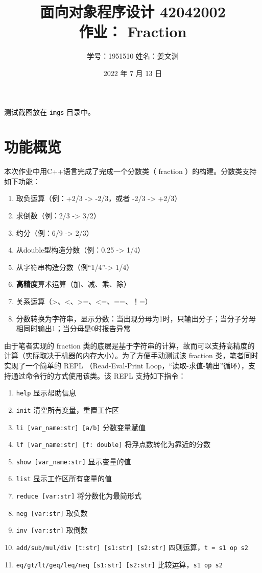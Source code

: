 \documentclass[cn,black,12pt,normal]{elegantnote}
\title{面向对象程序设计 42042002 \\ 作业： Fraction }
\author{学号：1951510 \hspace{30pt} 姓名：姜文渊}
\institute{Tongji University}
\date{2022 年 7 月 13 日}
\newcommand{\setParDef}{\setlength {\parskip} {0pt} }
\begin{document}
\maketitle

测试截图放在 \lstinline{imgs} 目录中。

\section{功能概览}

本次作业中用C++语言完成了完成一个分数类（ fraction ）的构建。分数类支持如下功能：
\begin{enumerate}
    \item 取负运算（例：+2/3 -> -2/3，或者 -2/3 -> +2/3）
    \item 求倒数（例：2/3 -> 3/2）
    \item 约分（例：6/9 -> 2/3）
    \item 从double型构造分数（例：0.25 -> 1/4）
    \item 从字符串构造分数（例“1/4”-> 1/4）
    \item \textbf{高精度}算术运算（加、减、乘、除）
    \item 关系运算（>、<、>=、<=、==、！=）
    \item 分数转换为字符串，显示分数：当出现分母为1时，只输出分子；当分子分母相同时输出1；当分母是0时报告异常
\end{enumerate}
由于笔者实现的 fraction 类的底层是基于字符串的计算，故而可以支持高精度的计算（实际取决于机器的内存大小）。为了方便手动测试该 fraction 类，笔者同时实现了一个简单的 REPL （Read-Eval-Print Loop，“读取-求值-输出”循环），支持通过命令行的方式使用该类。该 REPL 支持如下指令：
\begin{enumerate}
    \item \lstinline{help} 显示帮助信息
    \item \lstinline{init} 清空所有变量，重置工作区
    \item \lstinline{li [var_name:str] [a/b]} 分数变量赋值
    \item \lstinline{lf [var_name:str] [f: double]} 将浮点数转化为靠近的分数
    \item \lstinline{show [var_name:str]} 显示变量的值
    \item \lstinline{list} 显示工作区所有变量的值
    \item \lstinline{reduce [var:str]} 将分数化为最简形式
    \item \lstinline{neg [var:str]} 取负数
    \item \lstinline{inv [var:str]} 取倒数
    \item \lstinline{add/sub/mul/div [t:str] [s1:str] [s2:str]} 四则运算，\lstinline{t = s1 op s2}
    \item \lstinline{eq/gt/lt/geq/leq/neq [s1:str] [s2:str]} 比较运算，\lstinline{s1 op s2}
\end{enumerate}
\end{document}
